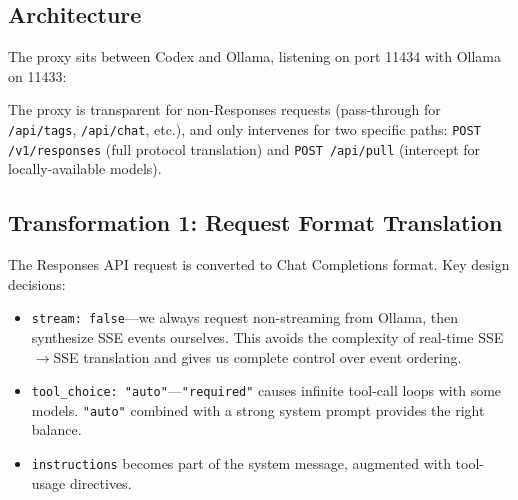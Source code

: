 \documentclass[11pt,a4paper]{article}
\begin{document}
\subsection{Architecture}

The proxy sits between Codex and Ollama, listening on port 11434 with
Ollama on 11433:

\begin{figure}[H]
\centering
{}
\end{figure}

The proxy is transparent for non-Responses requests (pass-through for
\texttt{/api/tags}, \texttt{/api/chat}, etc.), and only intervenes for two
specific paths: \texttt{POST /v1/responses} (full protocol translation) and
\texttt{POST /api/pull} (intercept for locally-available models).

\subsection{Transformation 1: Request Format Translation}

The Responses API request is converted to Chat Completions format.
Key design decisions:

\begin{itemize}
  \item \texttt{stream: false}---we always request non-streaming from
        Ollama, then synthesize SSE events ourselves. This avoids the
        complexity of real-time SSE$\rightarrow$SSE translation and gives us
        complete control over event ordering.
  \item \texttt{tool\_choice: "auto"}---\texttt{"required"} causes infinite
        tool-call loops with some models. \texttt{"auto"} combined with a
        strong system prompt provides the right balance.
  \item \texttt{instructions} becomes part of the system message, augmented
        with tool-usage directives.
\end{itemize}
\end{document}
